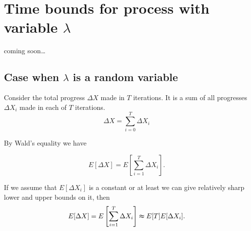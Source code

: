 \documentclass[12pt, a4paper]{article}
\theoremstyle{remark}
\newcommand{\cm}{coming soon\dots}
\begin{document}











\section{Time bounds for process with variable $\lambda$}
\cm
\subsection{Case when $\lambda$ is a random variable}
Consider the total progress $\Delta X$ made in $T$ iterations. It is a sum of all progresses $\Delta X_i$ made in each of $T$ iterations.
\[
    \Delta X = \sum_{i = 0}^{T} \Delta X_i
\]

By Wald's equality we have

\[
    E[\Delta X] = E\left[\sum_{i = 1}^{T} \Delta X_i\right].
\]

If we assume that $E[\Delta X_i]$ is a constant or at least we can give relatively sharp lower and upper bounds on it, then
\[
    E[\Delta X] = E\left[\sum_{i = 1}^{T} \Delta X_i\right] \thickapprox E[T] E[\Delta X_i].
\]
\end{document}
